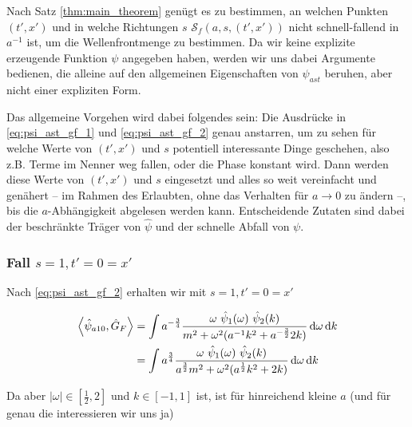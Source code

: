 Nach Satz \eqref{thm:main_theorem} genügt es zu bestimmen, an welchen Punkten
$(t', x')$ und in welche Richtungen $s$ $\mathcal{S}_f(a,s,(t',x'))$ nicht schnell-fallend in $a^{-1}$ ist, um die Wellenfrontmenge zu bestimmen. Da wir keine explizite erzeugende Funktion $\psi$ angegeben haben, werden wir uns dabei Argumente bedienen, die alleine auf den allgemeinen Eigenschaften von $\psi_{ast}$ beruhen, aber nicht einer expliziten Form.



Das allgemeine Vorgehen wird dabei folgendes sein: Die Ausdrücke in \eqref{eq:psi_ast_gf_1}
und \eqref{eq:psi_ast_gf_2} genau anstarren, um zu sehen für welche Werte von
$(t',x')$ und $s$ potentiell interessante Dinge geschehen, also z.B. Terme im Nenner
weg fallen, oder die Phase konstant wird. Dann werden diese Werte von $(t',x')$ und
$s$ eingesetzt und alles so weit vereinfacht und genähert -- im Rahmen des Erlaubten, ohne
das Verhalten für $a \rightarrow 0$ zu ändern --, bis die $a$-Abhängigkeit abgelesen
werden kann. Entscheidende Zutaten sind dabei der beschränkte Träger von $\hat \psi$
und der schnelle Abfall von $\psi$.


\subsubsection*{Fall $s=1, t' = 0 = x'$}
Nach \eqref{eq:psi_ast_gf_2} erhalten wir mit $s=1, t' = 0 = x'$

\begin{align*}
    \left< \hat\psi_{a10}, \hat G_F \right>
    &=
    \int a^{-\frac{3}{4}} \frac{
        \omega ~\hat \psi_1(\omega) ~\hat \psi_2(k)
    }
    {
        m^2+\omega^2 (a^{-1}k^2 + a^{-\frac{3}{2}}2 k )
    }
    \mathop{}\!\mathrm{d} \omega \mathop{}\!\mathrm{d} k \\
    &=
    \int a^{\frac{3}{4}} \frac{
        \omega ~\hat \psi_1(\omega) ~\hat \psi_2(k)
    }
    {
        a^{\frac{3}{2}} m^2+\omega^2 (a^{\frac{1}{2}}k^2 + 2 k )
    }
    \mathop{}\!\mathrm{d} \omega \mathop{}\!\mathrm{d} k
\end{align*}

Da aber $|\omega| \in [\frac{1}{2},2]$ und $k \in [-1,1]$ ist, ist für hinreichend
kleine $a$ (und für genau die interessieren wir uns ja)

